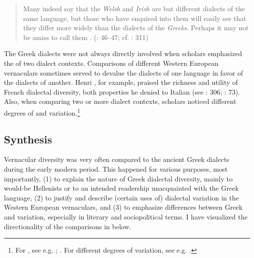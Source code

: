 \begin{quote}
Many indeed say that the \textit{Welsh} and \textit{Irish} are but different dialects of the same language, but those who have enquired into them will easily see that they differ more widely than the dialects of the \textit{Greeks}. Perhaps it may not be amiss to call them . (\citealt{Malcolm1738}: 46–47; cf. \citealt{Macnicol1779}: 311)
\end{quote}

The Greek dialects were not always directly involved when scholars emphasized the  of two dialect contexts. Comparisons of different Western European vernaculars sometimes served to devalue the dialects of one language in favor of the dialects of another. Henri \citet[133--134]{Estienne1579}, for example, praised the richness and utility of French dialectal diversity, both properties he denied to Italian (see \citealt{Swiggers1997}: 306; \citeyear{Swiggers2009}: 73). Also, when comparing two or more  dialect contexts, scholars noticed different degrees of  and variation.\footnote{For , see e.g. \citet[158\textsc{\textsuperscript{r}}\textsc{–158}\textsc{\textsuperscript{v}}]{Hosius1560}; \citet[77 – I refer to the German translation of the Swedish original, published in 1746/1747]{Hogstrom1748}. For different degrees of variation, see e.g. \citet[27, 57]{Sajnovics1770}.}

\subsection{Synthesis}

Vernacular diversity was very often compared to the ancient Greek dialects during the early modern period. This happened for various purposes, most importantly, (1) to explain the nature of Greek dialectal diversity, mainly to would-be Hellenists or to an intended readership unacquainted with the Greek language, (2) to justify and describe (certain uses of) dialectal variation in the Western European vernaculars, and (3) to emphasize differences between Greek and  variation, especially in literary and sociopolitical terms. I have visualized the directionality of the comparisons in  below.

